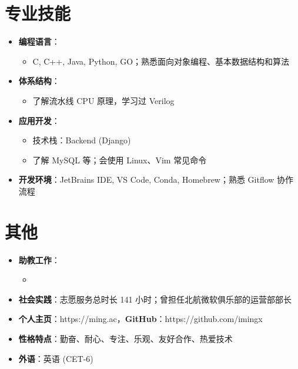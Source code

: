 \documentclass{resume}
\begin{document}
\section{专业技能}
\begin{itemize}
  \item \textbf{编程语言}：
    \begin{itemize}
      \item C, C++, Java, Python, GO；熟悉面向对象编程、基本数据结构和算法
    \end{itemize}
  \item \textbf{体系结构}：
    \begin{itemize}
      \item 了解流水线 CPU 原理，学习过 Verilog 
    \end{itemize}

  \item \textbf{应用开发}：
    \begin{itemize}
      \item 技术栈：Backend (Django)
      \item 了解 MySQL 等；会使用 Linux、Vim 常见命令
    \end{itemize}

  \item \textbf{开发环境}：JetBrains IDE, VS Code, Conda, Homebrew；熟悉 Gitflow 协作流程
\end{itemize}


\section{其他}
\begin{itemize}
  \item \textbf{助教工作}：
        \begin{itemize}
          \item {}
        \end{itemize}
  \item \textbf{社会实践}：志愿服务总时长 141 小时；曾担任北航微软俱乐部的运营部部长
  \item \textbf{个人主页}：https://ming.ac，\textbf{GitHub}：https://github.com/imingx
  \item \textbf{性格特点}：勤奋、耐心、专注、乐观、友好合作、热爱技术
  \item \textbf{外语}：英语 (CET-6)
\end{itemize}
\end{document}

